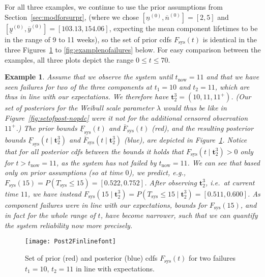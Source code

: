 \documentclass[12pt,a4paper,twocolumn,fleqn]{narms}
\renewcommand{\vec}[1]{{\bm#1}}
\newcommand{\uz}{^{(0)}} %
\newcommand{\ul}[1]{\underline{#1}}
\newcommand{\ol}[1]{\overline{#1}}
\newcommand{\Fsys}{F_\text{sys}}
\newcommand{\lFsys}{\ul{F}_\text{sys}}
\newcommand{\uFsys}{\ol{F}_\text{sys}}
\def\yzl{\ul{y}\uz}
\def\yzu{\ol{y}\uz}
\def\nzl{\ul{n}\uz}
\def\nzu{\ol{n}\uz}
\newtheorem{example}{Example}
\begin{document}
For all three examples, we continue to use the prior assumptions from Section~\ref{sec:modforsurpr},
(where we chose $[\nzl, \nzu] = [2,5]$ and $[\yzl, \yzu] = [103.13, 154.06]$,
expecting the mean component lifetimes to be in the range of 9 to 11 weeks),
so the set of prior cdfs $\Fsys(t)$ is identical in the three Figures~\ref{fig:exampletwofailuresinline} to \ref{fig:examplenofailures} below.
For easy comparison between the examples, all three plots depict the range $0 \leq t \leq 70$.

\begin{example}
\label{ex:1}
Assume that we observe the system until $t_\text{now} = 11$
and that we have seen failures for two of the three components
at $t_1=10$ and $t_2=11$, which are thus in line with our expectations.
We therefore have $\vec{t}_2^3 = (10, 11, 11^+)$.
(Our set of posteriors for the Weibull scale parameter $\lambda$ would thus be like in Figure~\ref{fig:setofpost-nopdc}
were it not for the additional censored observation $11^+$.)
The prior bounds $\lFsys(t)$ and $\uFsys(t)$ (red),
and the resulting posterior bounds $\lFsys(t \mid \vec{t}_2^3)$ and $\uFsys(t \mid \vec{t}_2^3)$ (blue),  
are depicted in Figure~\ref{fig:exampletwofailuresinline}.
Notice that for all posterior cdfs between the bounds
it holds that $\Fsys(t \mid \vec{t}_2^3) > 0$ only for $t > t_\text{now} = 11$,
as the system has not failed by $t_\text{now} = 11$.
We can see that based only on prior assumptions (so at time $0$),
we predict, e.g., $\Fsys(15) = P(T_\text{sys} \leq 15) = [0.522, 0.752]$.
After observing $\vec{t}_2^3$, i.e.\ at current time $11$,
we have instead $\Fsys(15 \mid \vec{t}_2^3) = P(T_\text{sys} \leq 15 \mid \vec{t}_2^3) = [0.511, 0.600]$.
As component failures were in line with our expectations,
bounds for $\Fsys(15)$, and in fact for the whole range of $t$, 
have become narrower,
such that we can quantify the system reliability now more precisely.
\end{example}

\begin{figure}
\texttt{[image: Post2Finlinefont]}
\caption{Set of prior (red) and posterior (blue) cdfs $F_\text{sys}(t)$ for two failures $t_1 = 10$, $t_2 = 11$ in line with expectations.}
\label{fig:exampletwofailuresinline}
\end{figure}
\end{document}
